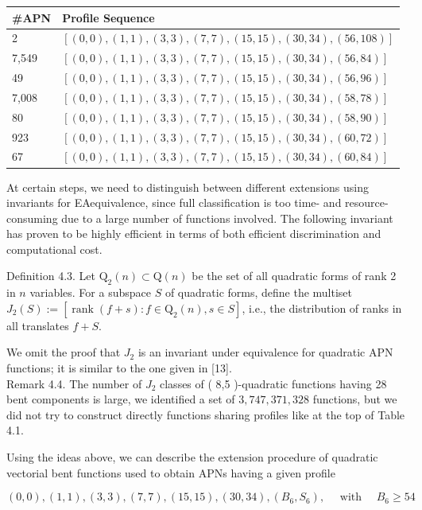 \documentclass[10pt]{article}
\begin{document}
\begin{center}
\begin{tabular}{|l|l|}
\hline
\#APN & Profile Sequence \\
\hline
2 & $[(0,0),(1,1),(3,3),(7,7),(15,15),(30,34),(56,108)]$ \\
\hline
7,549 & $[(0,0),(1,1),(3,3),(7,7),(15,15),(30,34),(56,84)]$ \\
\hline
49 & $[(0,0),(1,1),(3,3),(7,7),(15,15),(30,34),(56,96)]$ \\
\hline
7,008 & $[(0,0),(1,1),(3,3),(7,7),(15,15),(30,34),(58,78)]$ \\
\hline
80 & $[(0,0),(1,1),(3,3),(7,7),(15,15),(30,34),(58,90)]$ \\
\hline
923 & $[(0,0),(1,1),(3,3),(7,7),(15,15),(30,34),(60,72)]$ \\
\hline
67 & $[(0,0),(1,1),(3,3),(7,7),(15,15),(30,34),(60,84)]$ \\
\hline
\end{tabular}
\end{center}

At certain steps, we need to distinguish between different extensions using invariants for EAequivalence, since full classification is too time- and resource-consuming due to a large number of functions involved. The following invariant has proven to be highly efficient in terms of both efficient discrimination and computational cost.

Definition 4.3. Let $\mathrm{Q}_{2}(n) \subset \mathrm{Q}(n)$ be the set of all quadratic forms of rank 2 in $n$ variables. For a subspace $S$ of quadratic forms, define the multiset $J_{2}(S):=\left[\operatorname{rank}(f+s): f \in \mathrm{Q}_{2}(n), s \in S\right]$, i.e., the distribution of ranks in all translates $f+S$.

We omit the proof that $J_{2}$ is an invariant under equivalence for quadratic APN functions; it is similar to the one given in [13].\\
Remark 4.4. The number of $J_{2}$ classes of ( 8,5 )-quadratic functions having 28 bent components is large, we identified a set of $3,747,371,328$ functions, but we did not try to construct directly functions sharing profiles like at the top of Table 4.1.

Using the ideas above, we can describe the extension procedure of quadratic vectorial bent functions used to obtain APNs having a given profile


\begin{equation*}
(0,0),(1,1),(3,3),(7,7),(15,15),(30,34),\left(B_{6}, S_{6}\right), \quad \text { with } \quad B_{6} \geq 54 \tag{4.2}
\end{equation*}
\end{document}
